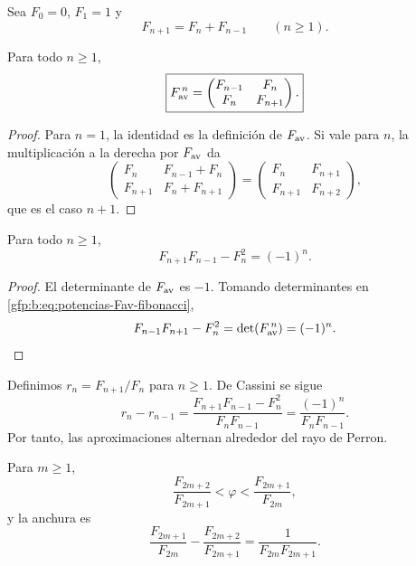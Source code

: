Sea \(F_0=0\), \(F_1=1\) y
\[
 F_{n+1}=F_n+F_{n-1}\qquad(n\geq1).
\]

\begin{theorem}
\label{gfp:b:thm:potencias-fibonacci-phi}
Para todo \(n\geq1\),
\begin{equation}
 \boxed{
 F_{\rm av}^{\,n}=
 \begin{pmatrix}
 F_{n-1}&F_n\\
 F_n&F_{n+1}
 \end{pmatrix}.}
 \label{gfp:b:eq:potencias-Fav-fibonacci}
\end{equation}
\end{theorem}

\begin{proof}
Para \(n=1\), la identidad es la definición de \(F_{\rm av}\). Si vale
para \(n\), la multiplicación a la derecha por \(F_{\rm av}\) da
\[
 \begin{pmatrix}
 F_n&F_{n-1}+F_n\\
 F_{n+1}&F_n+F_{n+1}
 \end{pmatrix}
 =
 \begin{pmatrix}
 F_n&F_{n+1}\\
 F_{n+1}&F_{n+2}
 \end{pmatrix},
\]
que es el caso \(n+1\).
\end{proof}

\begin{theorem}
\label{gfp:b:thm:cassini-phi}
Para todo \(n\geq1\),
\begin{equation}
 \boxed{F_{n+1}F_{n-1}-F_n^2=(-1)^n.}
 \label{gfp:b:eq:cassini-phi}
\end{equation}
\end{theorem}

\begin{proof}
El determinante de \(F_{\rm av}\) es \(-1\). Tomando determinantes en
\eqref{gfp:b:eq:potencias-Fav-fibonacci},
\[
 F_{n-1}F_{n+1}-F_n^2
 =\det(F_{\rm av}^{\,n})=(-1)^n.
\]
\end{proof}

Definimos \(r_n=F_{n+1}/F_n\) para \(n\geq1\). De Cassini se sigue
\[
 r_n-r_{n-1}
 =\frac{F_{n+1}F_{n-1}-F_n^2}{F_nF_{n-1}}
 =\frac{(-1)^n}{F_nF_{n-1}}.
\]
Por tanto, las aproximaciones alternan alrededor del rayo de Perron.

\begin{proposition}
\label{gfp:b:prop:horquillas-perron-phi}
Para \(m\geq1\),
\begin{equation}
 \frac{F_{2m+2}}{F_{2m+1}}
 <\varphi<
 \frac{F_{2m+1}}{F_{2m}},
 \label{gfp:b:eq:horquilla-fibonacci-phi}
\end{equation}
y la anchura es
\begin{equation}
 \boxed{
 \frac{F_{2m+1}}{F_{2m}}
 -\frac{F_{2m+2}}{F_{2m+1}}
 =\frac{1}{F_{2m}F_{2m+1}}.}
 \label{gfp:b:eq:anchura-fibonacci-phi}
\end{equation}
\end{proposition}

